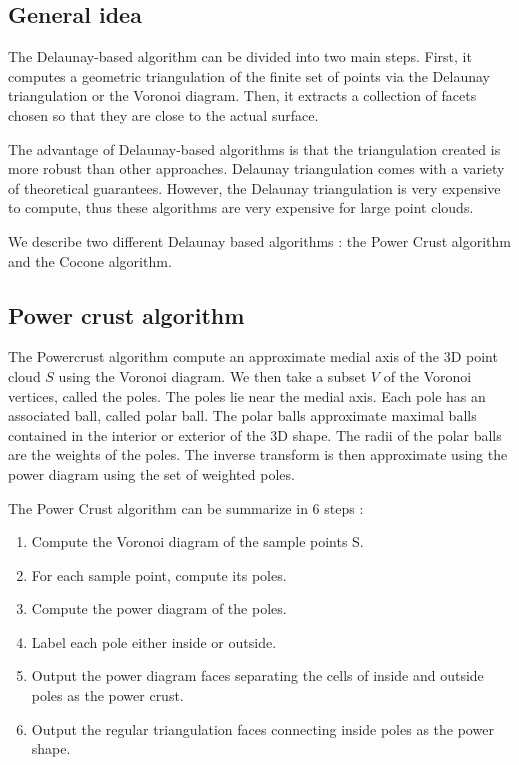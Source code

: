 \documentclass[a4paper]{article}
\begin{document}
\subsection{General idea}
The Delaunay-based algorithm can be divided into two main steps. First, it computes a geometric triangulation of the finite set of points via the Delaunay triangulation or the Voronoi diagram. Then, it extracts a collection of facets chosen so that they are close to the actual surface.

The advantage of Delaunay-based algorithms is that the triangulation created is more robust than other approaches. Delaunay triangulation comes with a variety of theoretical guarantees. However, the Delaunay triangulation is very expensive to compute, thus these algorithms are very expensive for large point clouds.

We describe two different Delaunay based algorithms : the Power Crust algorithm and the Cocone algorithm.

\subsection{Power crust algorithm}
The Powercrust algorithm compute an approximate medial axis of the 3D point cloud $S$ using the Voronoi diagram. We then take a subset $V$ of the Voronoi vertices, called the poles. The poles lie near the medial axis. Each pole has an associated ball, called polar ball. The polar balls approximate maximal balls contained in the interior or exterior of the 3D shape. The radii of the polar balls are the weights of the poles. The inverse transform is then approximate using the power diagram using the set of weighted poles.

The Power Crust algorithm can be summarize in 6 steps :
\begin{enumerate}
\item Compute the Voronoi diagram of the sample points S.
\item For each sample point, compute its poles.
\item Compute the power diagram of the poles.
\item Label each pole either inside or outside.
\item Output the power diagram faces separating the cells of inside and outside poles as the power crust.
\item Output the regular triangulation faces connecting inside poles as the power shape.
\end{enumerate}
\end{document}
